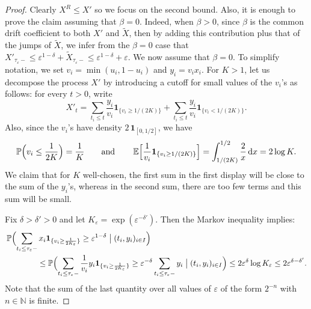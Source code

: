 \documentclass[british, a4paper,11pt]{article}
\numberwithin{equation}{section}
\theoremstyle{definition}
\renewcommand{\P}{\mathop{}\!\mathbb{P}}
\newcommand{\E}{\mathop{}\!\mathbb{E}}
\newcommand{\N}{\mathbb{N}}
\renewcommand{\d}{\mathop{}\!\mathrm{d}}
\newcommand{\ind}[1]{\mathbf{1}_{\{#1\}}}
\begin{document}
\begin{proof}
Clearly $X^R \leq X'$ so we focus on the second bound. Also, it is enough to prove the claim assuming that $\beta=0$. Indeed, when $\beta>0$, since $\beta$ is the common drift coefficient to both $X'$ and $\widetilde{X}$, then by adding this contribution plus that of the jumps of $\widetilde{X}$, we infer from the $\beta=0$ case that $X'_{\tau_{\varepsilon}-} \leq \varepsilon^{1-\delta} + \widetilde{X}_{\tau_{\varepsilon}-}\leq \varepsilon^{1-\delta} + \varepsilon$.
We now assume that $\beta=0$. To simplify notation, we set $v_{i}=\min(u_{i},1-u_{i})$ and $y_{i}= v_{i} x_{i}$.
For $K>1$, let us decompose the process $X'$ by introducing a cutoff for small values of the $v_{i}$'s as follows: for every $t>0$, write
\[X'_{t} = \sum_{t_{i} \leq t} \frac{y_{i}}{v_{i}} \ind{v_{i} \geq 1/(2K)} + \sum_{t_{i} \leq t} \frac{y_{i}}{v_{i}} \ind{v_{i} < 1/(2K)}.\]
Also, since the $v_{i}$'s have density $2\,\mathbf{1}_{[0,1/2]}$, we have
\[\P\Bigl(v_{i} \leq  \frac{1}{2K}\Bigr) = \frac{1}{K}
\qquad\text{and}\qquad 
\E\Bigl[\frac{1}{v_{i}} \ind{v_{i} \geq 1/(2K)}\Bigr] = \int_{ 1/(2K)}^{ 1/2} \frac{2}{x} \d x = 2 \log K.\]
We claim that for $K$ well-chosen, the first sum in the first display will be close to the sum of the $y_{i}$'s, whereas in the second sum, there are too few terms and this sum will be small.

Fix $\delta > \delta' > 0$ and let $K_\varepsilon = \exp(\varepsilon^{-\delta'})$. Then the Markov inequality implies:
\begin{align*}
&\P\Bigl(\sum_{t_{i} \leq \tau_\varepsilon-} x_{i} \ind{v_{i} \geq \frac{1}{2K_\varepsilon}} \geq \varepsilon^{1-\delta}\bigm|(t_{i},y_{i})_{i \in I}\Bigr)\\
 & \qquad \qquad \leq \P\Bigl(\sum_{t_{i} \leq \tau_\varepsilon-} \frac{1}{v_{i}} y_{i} \ind{v_{i} \geq \frac{1}{2K_\varepsilon}} \geq \varepsilon^{-\delta} \sum_{t_{i} \leq \tau_\varepsilon-} y_{i} \bigm| (t_{i},y_{i})_{i \in I}\Bigr)
\leq 2 \varepsilon^{\delta} \log K_\varepsilon
\leq 2 \varepsilon^{\delta-\delta'}.
\end{align*}
Note that the sum of the last quantity over all values of $\varepsilon$ of the form $2^{-n}$ with $n \in \N$ is finite.



\end{proof}
\end{document}
